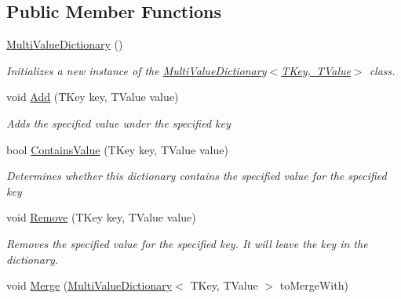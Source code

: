 \subsection*{Public Member Functions}
\begin{DoxyCompactItemize}
\item 
\mbox{\hyperlink{class_super_tiled2_unity_1_1_editor_1_1_s_d_1_1_tools_1_1_algorithmia_1_1_general_data_structures_1_1_multi_value_dictionary_a88bdd33727b767235b716c268c4a52d2}{Multi\+Value\+Dictionary}} ()
\begin{DoxyCompactList}\small\item\em Initializes a new instance of the \mbox{\hyperlink{class_super_tiled2_unity_1_1_editor_1_1_s_d_1_1_tools_1_1_algorithmia_1_1_general_data_structures_1_1_multi_value_dictionary_a88bdd33727b767235b716c268c4a52d2}{Multi\+Value\+Dictionary$<$\+T\+Key, T\+Value$>$}} class. \end{DoxyCompactList}\item 
void \mbox{\hyperlink{class_super_tiled2_unity_1_1_editor_1_1_s_d_1_1_tools_1_1_algorithmia_1_1_general_data_structures_1_1_multi_value_dictionary_ab8022bd65275815aa9f61cbe33c07fab}{Add}} (T\+Key key, T\+Value value)
\begin{DoxyCompactList}\small\item\em Adds the specified value under the specified key \end{DoxyCompactList}\item 
bool \mbox{\hyperlink{class_super_tiled2_unity_1_1_editor_1_1_s_d_1_1_tools_1_1_algorithmia_1_1_general_data_structures_1_1_multi_value_dictionary_ab98e6429022ba2fa8ca951e73ffb345f}{Contains\+Value}} (T\+Key key, T\+Value value)
\begin{DoxyCompactList}\small\item\em Determines whether this dictionary contains the specified value for the specified key \end{DoxyCompactList}\item 
void \mbox{\hyperlink{class_super_tiled2_unity_1_1_editor_1_1_s_d_1_1_tools_1_1_algorithmia_1_1_general_data_structures_1_1_multi_value_dictionary_a084278ce15ca1cd8eb913511fbe5b7df}{Remove}} (T\+Key key, T\+Value value)
\begin{DoxyCompactList}\small\item\em Removes the specified value for the specified key. It will leave the key in the dictionary. \end{DoxyCompactList}\item 
void \mbox{\hyperlink{class_super_tiled2_unity_1_1_editor_1_1_s_d_1_1_tools_1_1_algorithmia_1_1_general_data_structures_1_1_multi_value_dictionary_af9d3e836e512ec78970c0c037a8f9000}{Merge}} (\mbox{\hyperlink{class_super_tiled2_unity_1_1_editor_1_1_s_d_1_1_tools_1_1_algorithmia_1_1_general_data_structures_1_1_multi_value_dictionary}{Multi\+Value\+Dictionary}}$<$ T\+Key, T\+Value $>$ to\+Merge\+With)

\end{DoxyCompactItemize}
